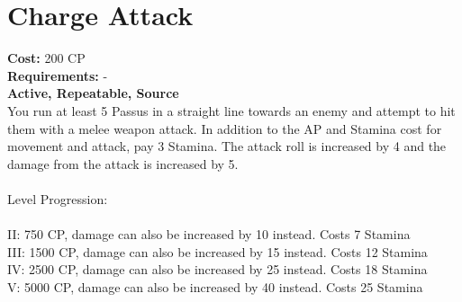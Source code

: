 \section{Charge Attack}
\textbf{Cost:} 200 CP\\
\textbf{Requirements:} -\\
\textbf{Active, Repeatable, Source}\\
You run at least 5 Passus in a straight line towards an enemy and attempt to hit them with a melee weapon attack. In addition to the AP and Stamina cost for movement and attack, pay 3 Stamina. The attack roll is increased by 4 and the damage from the attack is increased by 5.\\
\\
Level Progression:\\
\\
II: 750 CP, damage can also be increased by 10 instead. Costs 7 Stamina\\
III: 1500 CP, damage can also be increased by 15 instead. Costs 12 Stamina\\
IV: 2500 CP, damage can also be increased by 25 instead. Costs 18 Stamina\\
V: 5000 CP, damage can also be increased by 40 instead. Costs 25 Stamina\\